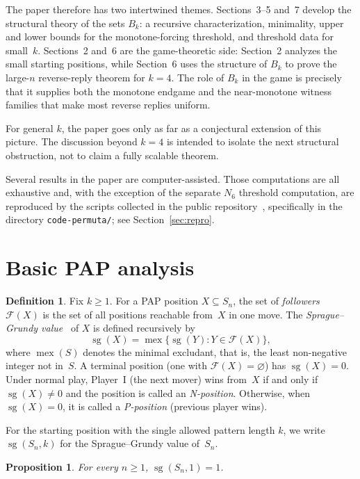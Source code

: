\documentclass[11pt]{amsart}
\newcommand{\Sym}{S}
\newcommand{\mex}{\operatorname{mex}}
\newcommand{\sg}{\operatorname{sg}}
\theoremstyle{plain}
\newtheorem{proposition}[theorem]{Proposition}
\theoremstyle{definition}
\newtheorem{definition}[theorem]{Definition}
\theoremstyle{remark}
\begin{document}
The paper therefore has two intertwined themes.  Sections~3--5 and~7 develop the structural theory
of the sets $B_k$: a recursive characterization, minimality, upper and lower bounds for the
monotone-forcing threshold, and threshold data for small~$k$.  Sections~2 and~6 are the
game-theoretic side: Section~2 analyzes the small starting positions, while Section~6 uses the
structure of $B_k$ to prove the large-$n$ reverse-reply theorem for $k=4$.  The role of $B_k$ in
the game is precisely that it supplies both the monotone endgame and the near-monotone witness
families that make most reverse replies uniform.

For general $k$, the paper goes only as far as a conjectural extension of this picture.  The
discussion beyond $k=4$ is intended to isolate the next structural obstruction, not to claim a
fully scalable theorem.

Several results in the paper are computer-assisted.  Those computations are all exhaustive
and, with the exception of the separate $N_6$ threshold computation, are reproduced by the scripts
collected in the public repository~\cite{game-patterns-repo}, specifically in the directory
\texttt{code-permuta/}; see Section~\ref{sec:repro}.

\section{Basic PAP analysis}

\begin{definition}
  Fix $k \geq 1$.  For a PAP position $X \subseteq \Sym_n$, the set of \emph{followers}
  $\mathcal{F}(X)$ is the set of all positions reachable from~$X$ in one move.  The
  \emph{Sprague--Grundy value}~\cite{sprague,grundy} of $X$ is defined recursively by
  \[
    \sg(X)=\mex\{\sg(Y):Y\in\mathcal{F}(X)\},
  \]
  where $\mex(S)$ denotes the minimal excludant, that is, the least non-negative integer not in~$S$.  A terminal position (one with
  $\mathcal{F}(X)=\varnothing$) has $\sg(X)=0$.  Under normal play, Player~I (the next mover) wins
  from~$X$ if and only if $\sg(X)\neq 0$ and the position is called an \emph{N-position}.
  Otherwise, when $\sg(X)=0$, it is called a \emph{P-position} (previous player wins).
\end{definition}

For the starting position with the single allowed pattern length $k$, we write $\sg(\Sym_n,k)$ for
the Sprague--Grundy value of~$\Sym_n$.

\begin{proposition}
  For every $n \geq 1$, $\sg(\Sym_n,1)=1$.
\end{proposition}
\end{document}
